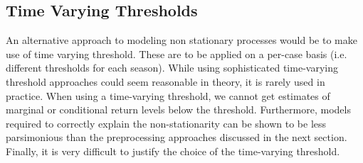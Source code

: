 \documentclass{article}
\theoremstyle{definition}
\theoremstyle{definition}
\begin{document}
\subsection{Time Varying Thresholds}
An alternative approach to modeling non stationary processes would be to make use of time varying threshold. These are to be applied on a per-case basis (i.e. different thresholds for each season). While using sophisticated time-varying threshold approaches could seem reasonable in theory, it is rarely used in practice. When using a time-varying threshold, we cannot get estimates of marginal or conditional return levels below the threshold. Furthermore, models required to correctly explain the
non-stationarity can be shown to be less parsimonious than the preprocessing approaches discussed in the next section. Finally, it is very difficult to justify the choice of the time-varying threshold.
\end{document}
